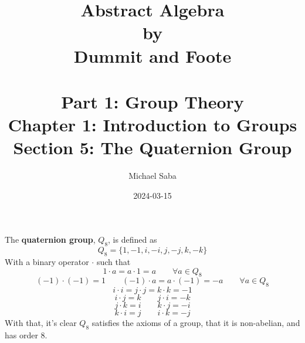 \documentclass[12pt]{article}
\title{%
    \Huge Abstract Algebra \\
    \large by \\
    \Large Dummit and Foote \\~\\
    \huge Part 1: Group Theory \\
    \LARGE Chapter 1: Introduction to Groups \\
    \Large Section 5: The Quaternion Group
}
\date{2024-03-15}
\author{Michael Saba}
\begin{document}
    \maketitle
    \newpage


    The \textbf{quaternion group}, $Q_8$, is defined as
    \[ Q_8 = \{ 1, -1, i, -i, j, -j, k, -k \} \]
    With a binary operator $\cdot$ such that
    \[ 1 \cdot a = a \cdot 1 = a \qquad \forall a \in Q_8  \]
    \[ (-1)\cdot(-1) = 1 \qquad (-1)\cdot a = a\cdot (-1) = -a
    \qquad \forall a \in Q_8 \]
    \[ i \cdot i = j \cdot j = k \cdot k = -1 \]
    \[ i \cdot j = k \qquad j \cdot i = -k \]
    \[ j \cdot k = i \qquad k \cdot j = -i \]
    \[ k \cdot i = j \qquad i \cdot k = -j \]
    With that,
    it's clear $Q_8$ satisfies the axioms of a group,
    that it is non-abelian,
    and has order $8$. \\

    
\end{document}
